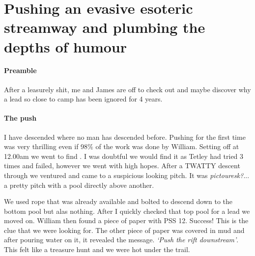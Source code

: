 

\section{Pushing an evasive esoteric streamway and plumbing the depths of humour}


\paragraph{Preamble}
After a leasurely shit, me and James are off to check out  and maybe discover why a lead so close to camp has been ignored for 4 years.
\paragraph{The push} I have descended where no man has descended before. Pushing for the first time was very thrilling even if 98$\%$ of the work was done by William. 
Setting off at 12.00am we went to find . I was doubtful we would find it as Tetley had tried 3 times and failed, however we went with high hopes.
After a TWATTY descent through  we ventured  and came to a suspicious looking pitch. It was \textit{pictouresk?}...  a pretty pitch with a pool directly above another.

We used rope that was already available and bolted to descend down to the bottom pool but alas nothing. After I quickly checked that top pool for a lead we moved on. William then found a piece of paper with PSS 12. Success! This is the clue that we were looking for. The other piece of paper was covered in mud and after pouring water on it, it revealed the message.  \textit{`Push the rift downstream'}. This felt like a treasure hunt and we were hot under the trail.

